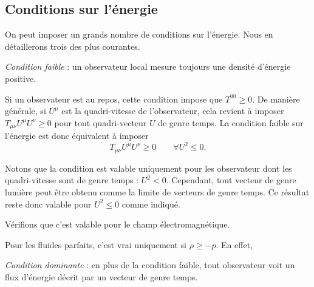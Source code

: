 \documentclass[a4paper,11pt]{report}
\begin{document}
        \subsection{Conditions sur l'énergie}
        
            On peut imposer un grands nombre de conditions sur l'énergie. Nous en détaillerons trois des plus courantes.
            
            \begin{defn}
                \textit{Condition faible} : un observateur local mesure toujours une densité d'énergie positive.
            \end{defn}
            
            Si un observateur est au repos, cette condition impose que $T^{00}\geq 0$. De manière générale, si $U^\mu$ est la quadri-vitesse de l'observateur, cela revient à imposer $T_{\mu\nu}U^\mu U^\nu \geq 0$ pour tout quadri-vecteur $U$ de genre temps. La condition faible sur l'énergie est donc équivalent à imposer 
            \begin{equation}
                T_{\mu\nu}U^\mu U^\nu \geq 0\qquad \forall U^2\leq 0.
            \end{equation}
            
            \begin{rmk}
                Notons que la condition est valable uniquement pour les observateur dont les quadri-vitesse sont de genre temps : $U^2<0$. Cependant, tout vecteur de genre lumière peut être obtenu comme la limite de vecteurs de genre temps. Ce résultat reste donc valable pour $U^2\leq0$ comme indiqué.
            \end{rmk}
            
            \begin{exmp}
                Vérifions que c'est valable pour le champ électromagnétique.
                \comp
            \end{exmp}
            
            \begin{exmp}
                Pour les fluides parfaits, c'est vrai uniquement si $\rho\geq -p$. En effet,
                \comp
            \end{exmp}
            
            \begin{defn}
                \textit{Condition dominante} : en plus de la condition faible, tout observateur voit un flux d'énergie décrit par un vecteur de genre temps.
            \end{defn}
            
\end{document}
